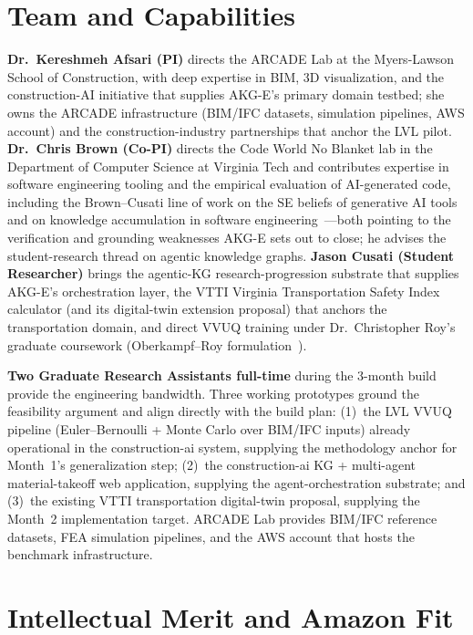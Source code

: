 \documentclass[conference, 10pt]{IEEEtran}
\begin{document}
\section{Team and Capabilities}

\textbf{Dr.~Kereshmeh Afsari (PI)} directs the ARCADE Lab at the Myers-Lawson School of Construction, with deep expertise in BIM, 3D visualization, and the construction-AI initiative that supplies AKG-E's primary domain testbed; she owns the ARCADE infrastructure (BIM/IFC datasets, simulation pipelines, AWS account) and the construction-industry partnerships that anchor the LVL pilot. \textbf{Dr.~Chris Brown (Co-PI)} directs the Code World No Blanket lab in the Department of Computer Science at Virginia Tech and contributes expertise in software engineering tooling and the empirical evaluation of AI-generated code, including the Brown--Cusati line of work on the SE beliefs of generative AI tools~\cite{brown2025exploring} and on knowledge accumulation in software engineering~\cite{cusati2026fose}---both pointing to the verification and grounding weaknesses AKG-E sets out to close; he advises the student-research thread on agentic knowledge graphs. \textbf{Jason Cusati (Student Researcher)} brings the agentic-KG research-progression substrate that supplies AKG-E's orchestration layer, the VTTI Virginia Transportation Safety Index calculator (and its digital-twin extension proposal) that anchors the transportation domain, and direct VVUQ training under Dr.~Christopher Roy's graduate coursework (Oberkampf--Roy formulation~\cite{Oberkampf2010VVUQ}).

\textbf{Two Graduate Research Assistants full-time} during the 3-month build provide the engineering bandwidth. Three working prototypes ground the feasibility argument and align directly with the build plan: (1)~the LVL VVUQ pipeline (Euler--Bernoulli + Monte Carlo over BIM/IFC inputs) already operational in the construction-ai system, supplying the methodology anchor for Month~1's generalization step; (2)~the construction-ai KG + multi-agent material-takeoff web application, supplying the agent-orchestration substrate; and (3)~the existing VTTI transportation digital-twin proposal, supplying the Month~2 implementation target. ARCADE Lab provides BIM/IFC reference datasets, FEA simulation pipelines, and the AWS account that hosts the benchmark infrastructure.

\section{Intellectual Merit and Amazon Fit}
\end{document}
